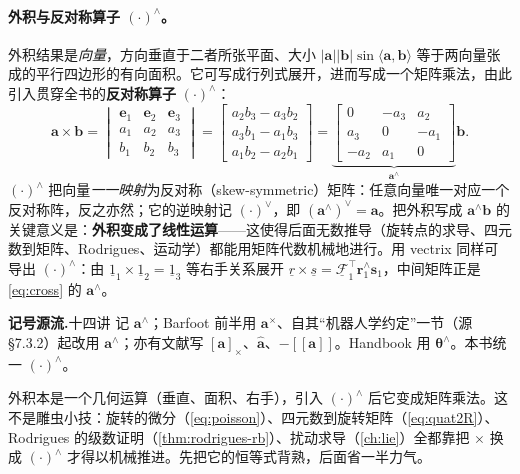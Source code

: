 \paragraph{外积与反对称算子 $(\cdot)^\wedge$。}外积结果是\emph{向量}，方向垂直于二者所张平面、大小 $|\mathbf{a}||\mathbf{b}|\sin\langle\mathbf{a},\mathbf{b}\rangle$ 等于两向量张成的平行四边形的有向面积。它可写成行列式展开，进而写成一个矩阵乘法，由此引入贯穿全书的\textbf{反对称算子} $(\cdot)^\wedge$：
\begin{equation}
  \mathbf{a}\times\mathbf{b}
  =\begin{vmatrix}\mathbf{e}_1&\mathbf{e}_2&\mathbf{e}_3\\a_1&a_2&a_3\\b_1&b_2&b_3\end{vmatrix}
  =\begin{bmatrix}a_2b_3-a_3b_2\\a_3b_1-a_1b_3\\a_1b_2-a_2b_1\end{bmatrix}
  =\underbrace{\begin{bmatrix}0&-a_3&a_2\\a_3&0&-a_1\\-a_2&a_1&0\end{bmatrix}}_{\mathbf{a}^\wedge}\mathbf{b}.
  \label{eq:cross}
\end{equation}
$(\cdot)^\wedge$ 把向量\emph{一一映射}为反对称（skew-symmetric）矩阵：任意向量唯一对应一个反对称阵，反之亦然；它的逆映射记 $(\cdot)^\vee$，即 $(\mathbf{a}^\wedge)^\vee=\mathbf{a}$。把外积写成 $\mathbf{a}^\wedge\mathbf{b}$ 的关键意义是：\textbf{外积变成了线性运算}——这使得后面无数推导（旋转点的求导、四元数到矩阵、Rodrigues、运动学）都能用矩阵代数机械地进行。用 vectrix 同样可导出 $(\cdot)^\wedge$：由 $\underline{1}_1\times\underline{1}_2=\underline{1}_3$ 等右手关系展开 $\underline{r}\times\underline{s}=\underline{\mathcal{F}}_1^\top\mathbf{r}_1^\wedge\mathbf{s}_1$，中间矩阵正是 \cref{eq:cross} 的 $\mathbf{a}^\wedge$\cite{barfoot2024state}。

\begin{note}
\textbf{记号源流.}\;十四讲\cite{gaoxiang2019slam14} 记 $\mathbf{a}^\wedge$；Barfoot 前半用 $\mathbf{a}^\times$、自其“机器人学约定”一节（源 §7.3.2）起改用 $\mathbf{a}^\wedge$；亦有文献写 $[\mathbf{a}]_\times$、$\hat{\mathbf{a}}$、$-[[\mathbf{a}]]$。Handbook\cite{carlone2026handbook} 用 $\boldsymbol{\theta}^\wedge$。本书统一 $(\cdot)^\wedge$。
\end{note}

\begin{insight}
外积本是一个几何运算（垂直、面积、右手），引入 $(\cdot)^\wedge$ 后它变成矩阵乘法。这不是雕虫小技：旋转的微分（\cref{eq:poisson}）、四元数到旋转矩阵（\cref{eq:quat2R}）、Rodrigues 的级数证明（\cref{thm:rodrigues-rb}）、扰动求导（\cref{ch:lie}）全都靠把 $\times$ 换成 $(\cdot)^\wedge$ 才得以机械推进。先把它的恒等式背熟，后面省一半力气。
\end{insight}

